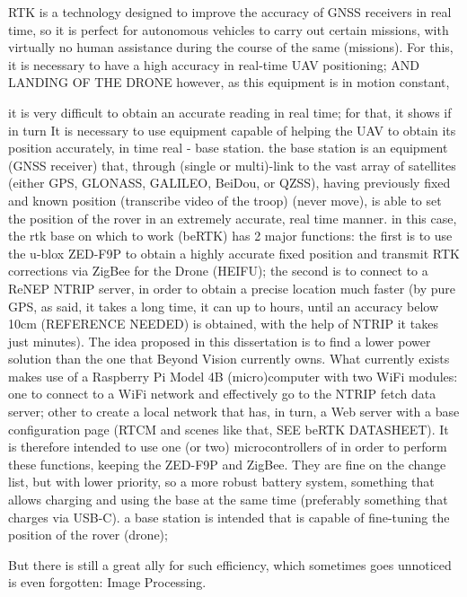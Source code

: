 RTK is a technology designed to improve the accuracy of GNSS receivers in real time, so it is perfect for autonomous vehicles to carry out certain missions, with virtually no human assistance during the course of the same (missions). For this, it is necessary to have a high accuracy in real-time UAV positioning; AND LANDING OF THE DRONE
however, as this equipment is in motion constant,

it is very difficult to obtain an accurate reading in real time;
for that, it shows if in turn It is necessary to use equipment capable of helping the UAV to obtain its position accurately, in time real - base station. the base station is an equipment (GNSS receiver) that, through (single or multi)-link to the vast array of satellites (either GPS, GLONASS, GALILEO, BeiDou, or QZSS),
having previously fixed and known position (transcribe video of the troop) (never move), is able to set the position of the rover in an extremely accurate, real time manner.
in this case, the rtk base on which to work (beRTK) has 2 major functions: the first is to use the u-blox ZED-F9P to obtain a highly accurate fixed position and transmit RTK corrections via ZigBee for the Drone (HEIFU);
the second is to connect to a ReNEP NTRIP server, in order to obtain a precise location much faster (by pure GPS, as said, it takes a long time, it can up to hours, until an accuracy below 10cm (REFERENCE NEEDED) is obtained, with the help of NTRIP it takes just minutes).
The idea proposed in this dissertation is to find a lower power solution than the one that Beyond Vision currently owns. What currently exists makes use of a Raspberry Pi Model 4B (micro)computer with two WiFi modules:
one to connect to a WiFi network and effectively go to the NTRIP fetch data server;
other to create a local network that has, in turn, a Web server with a base configuration page (RTCM and scenes like that, SEE beRTK DATASHEET). It is therefore intended to use one (or two) microcontrollers of in order to perform these functions, keeping the ZED-F9P and ZigBee.
They are fine on the change list, but with lower priority, so a more robust battery system, something that allows charging and using the base at the same time (preferably something that charges via USB-C).
a base station is intended that is capable of fine-tuning the position of the rover (drone);

But there is still a great ally for such efficiency, which sometimes goes unnoticed is even forgotten: Image Processing.

